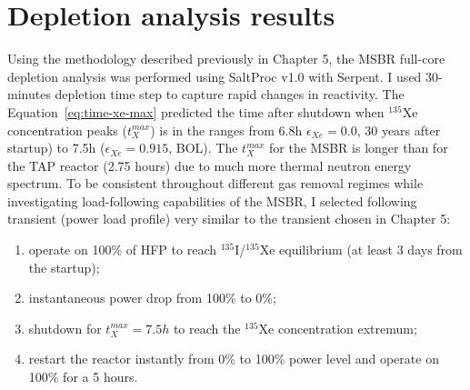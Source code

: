 \section{Depletion analysis results}
Using the methodology described previously in Chapter 5, the \gls{MSBR} 
full-core depletion analysis was performed using SaltProc v1.0 with Serpent. I 
used 30-minutes depletion time step to capture rapid changes in reactivity. 
The Equation~\ref{eq:time-xe-max} predicted the time after shutdown when 
$^{135}$Xe concentration peaks ($t^{max}_X$) is in the ranges from 6.8h 
$\epsilon_{Xe}=0.0$, 30 years after startup) to 7.5h ($\epsilon_{Xe}=0.915$, 
\gls{BOL}). The $t^{max}_X$ for the \gls{MSBR} is longer than 
for the \gls{TAP} reactor (2.75 hours) due to much more thermal neutron energy 
spectrum.
To be consistent throughout different gas removal regimes while 
investigating load-following capabilities of the \gls{MSBR}, I selected 
following transient (power load profile) very similar to the transient chosen 
in Chapter 5:
\begin{enumerate}[label=(\alph*), noitemsep, topsep=0pt]
	\item operate on 100\% of \gls{HFP} to reach $^{135}$I/$^{135}$Xe 
	equilibrium (at 
	least 3 days from the startup);
	\item instantaneous power drop from 100\% to 0\%;
	\item shutdown for $t^{max}_X=7.5h$ to reach the $^{135}$Xe concentration 
	extremum;
	\item restart the reactor instantly from 0\% to 100\% power level and 
	operate on 100\% for a 5 hours.
\end{enumerate}



